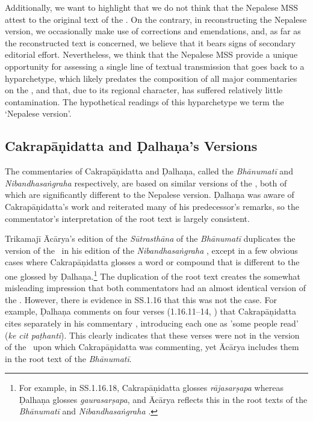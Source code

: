 Additionally, we want to highlight that we do not think that the Nepalese MSS attest to the original text of the \SS. On the contrary, in reconstructing the Nepalese version, we occasionally make use of corrections and emendations, and, as far as the reconstructed text is concerned, we believe that it bears signs of secondary editorial effort.
Nevertheless, we think that the Nepalese MSS provide a unique opportunity for assessing a single line of textual transmission that goes back to a hyparchetype, which likely predates the composition of all major commentaries on the \SS, and that, due to its regional character, has suffered relatively little contamination. The hypothetical readings of this hyparchetype we term the `Nepalese version'. 


\subsection{Cakrapāṇidatta and Ḍalhaṇa's Versions}
The commentaries of Cakrapāṇidatta and Ḍalhaṇa, called the \emph{Bhānumatī} and \emph{Nibandhasaṅgraha} respectively, are based on similar versions of the \SS, both of which are significantly different to the Nepalese version. Ḍalhaṇa was aware of Cakrapāṇidatta's work and reiterated many of his predecessor's remarks, so the commentator's interpretation of the root text is largely consistent. 

Trikamajī Ācārya's edition of the \textit{Sūtrasthāna} of the \emph{Bhānumatī} \citep{acar-1939} duplicates the version of the \SS\ in his edition of the \emph{Nibandhasaṅgraha} \citep{vulgate}, except in a few obvious cases where Cakrapāṇidatta glosses a word or compound that is different to the one glossed by Ḍalhaṇa.\footnote{For example, in SS.1.16.18, Cakrapāṇidatta glosses \emph{rājasarṣapa} whereas Ḍalhaṇa glosses \emph{gaurasarṣapa}, and Ācārya reflects this in the root texts of the \emph{Bhānumatī} \citep[130]{acar-1939} and \emph{Nibandhasaṅgraha} \citep[79]{vulgate}.} The duplication of the root text creates the somewhat misleading impression that both commentators had an almost identical version of the \SS. However, there is evidence in SS.1.16 that this was not the case. For example, Ḍalhaṇa comments on four verses (1.16.11–14, \cite[78]{vulgate}) that Cakrapāṇidatta cites separately in his commentary \citep[128–129]{acar-1939}, introducing each one as 'some people read' (\emph{ke cit paṭhanti}). This clearly indicates that these verses were not in the version of the \SS\ upon which Cakrapāṇidatta was commenting, yet Ācārya includes them in the root text of the \emph{Bhānumatī}.

